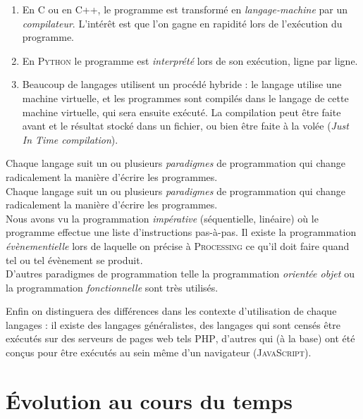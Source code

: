 \documentclass[a4paper,12pt,french]{book}
\begin{document}
\begin{enumerate}[\textbullet]
	\item 	En \textsc{C} ou en \textsc{C++}, le programme est transformé en \textit{langage-machine} par un \textit{compilateur}. L'intérêt est que l'on gagne en rapidité lors de l'exécution du programme.
	\item 	En \textsc{Python} le programme est \textit{interprété}  lors de son exécution, ligne par ligne.
	\item 	Beaucoup de langages utilisent un procédé hybride : le langage utilise une machine virtuelle, et les programmes sont compilés dans le langage de cette machine virtuelle, qui sera ensuite exécuté. La compilation peut être faite avant et le résultat stocké dans un fichier, ou bien être faite à la volée (\textit{Just In Time compilation}).
\end{enumerate}



Chaque langage suit un ou plusieurs \textit{paradigmes} de programmation qui change radicalement la manière d'écrire les programmes.\\
Chaque langage suit un ou plusieurs \textit{paradigmes} de programmation qui change radicalement la manière d'écrire les programmes.\\
Nous avons vu la programmation \textit{impérative} (séquentielle, linéaire) où le programme effectue une liste d'instructions pas-à-pas. Il existe la programmation \textit{évènementielle} lors de laquelle on précise à \textsc{Processing} ce qu'il doit faire quand tel ou tel évènement se produit.\\
D'autres paradigmes de programmation telle la programmation \textit{orientée objet} ou la programmation \textit{fonctionnelle} sont très utilisés.

Enfin on distinguera des différences dans les contexte d'utilisation de chaque langages : il existe des langages généralistes, des langages qui sont censés être exécutés sur des \og serveurs de pages web\fg{} tels \textsc{PHP}, d'autres qui (à la base) ont été conçus pour être exécutés au sein même d'un navigateur (\textsc{JavaScript}).


\section*{\'Evolution au cours du temps}
\end{document}
